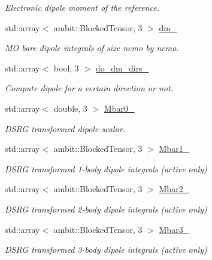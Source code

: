 \begin{DoxyCompactItemize}
\begin{DoxyCompactList}\small\item\em Electronic dipole moment of the reference. \end{DoxyCompactList}\item 
std\+::array$<$ ambit\+::\+Blocked\+Tensor, 3 $>$ \mbox{\hyperlink{classforte_1_1_m_a_s_t_e_r___d_s_r_g_a27e113591835f3d23c3c3de153d74448}{dm\+\_\+}}
\begin{DoxyCompactList}\small\item\em MO bare dipole integrals of size ncmo by ncmo. \end{DoxyCompactList}\item 
std\+::array$<$ bool, 3 $>$ \mbox{\hyperlink{classforte_1_1_m_a_s_t_e_r___d_s_r_g_a9df2cf3ded25c8823a4d92a430358691}{do\+\_\+dm\+\_\+dirs\+\_\+}}
\begin{DoxyCompactList}\small\item\em Compute dipole for a certain direction or not. \end{DoxyCompactList}\item 
std\+::array$<$ double, 3 $>$ \mbox{\hyperlink{classforte_1_1_m_a_s_t_e_r___d_s_r_g_a5c3c28eb6c26be2d215b955b5536c945}{Mbar0\+\_\+}}
\begin{DoxyCompactList}\small\item\em D\+S\+RG transformed dipole scalar. \end{DoxyCompactList}\item 
std\+::array$<$ ambit\+::\+Blocked\+Tensor, 3 $>$ \mbox{\hyperlink{classforte_1_1_m_a_s_t_e_r___d_s_r_g_a742aacadafe6bd428750114b3060d169}{Mbar1\+\_\+}}
\begin{DoxyCompactList}\small\item\em D\+S\+RG transformed 1-\/body dipole integrals (active only) \end{DoxyCompactList}\item 
std\+::array$<$ ambit\+::\+Blocked\+Tensor, 3 $>$ \mbox{\hyperlink{classforte_1_1_m_a_s_t_e_r___d_s_r_g_ac573ca0874b6f837ba5198b6db376cd4}{Mbar2\+\_\+}}
\begin{DoxyCompactList}\small\item\em D\+S\+RG transformed 2-\/body dipole integrals (active only) \end{DoxyCompactList}\item 
std\+::array$<$ ambit\+::\+Blocked\+Tensor, 3 $>$ \mbox{\hyperlink{classforte_1_1_m_a_s_t_e_r___d_s_r_g_a642aa06e3bc564a282be33c29925ecf2}{Mbar3\+\_\+}}
\begin{DoxyCompactList}\small\item\em D\+S\+RG transformed 3-\/body dipole integrals (active only) \end{DoxyCompactList}\end{DoxyCompactItemize}



